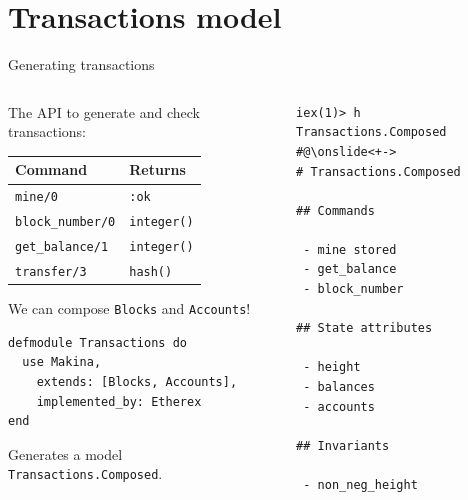 \documentclass[aspectratio=169, 10pt, handout]{beamer}
\begin{document}
\section{Transactions model}
\label{sec:org66f5463}
\begin{frame}[label={sec:orgd1afc9d},fragile]{Generating transactions}
 \begin{columns}
\begin{column}{0.48\columnwidth}
\onslide<+->
\onslide<+->
The API to generate and check transactions:
\onslide<+->
\begin{center}
\begin{tabular}{ll}
Command & Returns\\
\hline
\texttt{mine/0} & \texttt{:ok}\\
\texttt{block\_number/0} & \texttt{integer()}\\
\texttt{get\_balance/1} & \texttt{integer()}\\
\texttt{transfer/3} & \texttt{hash()}\\
\end{tabular}
\end{center}
\onslide<+->
We can compose \texttt{Blocks} and \texttt{Accounts}!
\onslide<+->
\lstset{language=elixir,label= ,caption= ,captionpos=b,numbers=none,style=display}
\begin{lstlisting}
defmodule Transactions do
  use Makina,
    extends: [Blocks, Accounts],
    implemented_by: Etherex
end
\end{lstlisting}
\onslide<+->
Generates a model \texttt{Transactions.Composed}.
\end{column}

\begin{column}{0.48\columnwidth}
\onslide<+->
\lstset{language=bash,label= ,caption= ,captionpos=b,numbers=none,style=shell}
\begin{lstlisting}
iex(1)> h Transactions.Composed
#@\onslide<+->
# Transactions.Composed

## Commands

 - mine stored
 - get_balance
 - block_number

## State attributes

 - height
 - balances
 - accounts

## Invariants

 - non_neg_height

\end{lstlisting}
\end{column}
\end{columns}
\end{frame}
\end{document}

